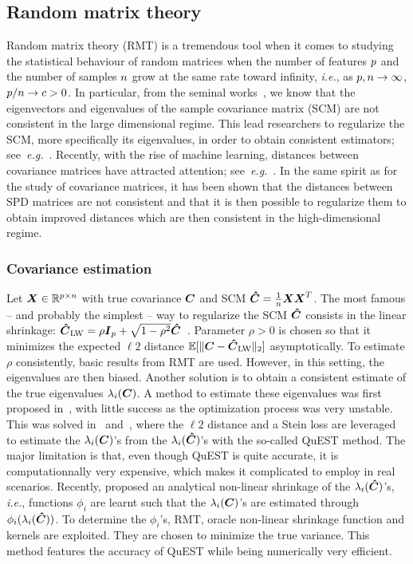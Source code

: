 \documentclass{article}
\theoremstyle{plain}
\theoremstyle{definition}
\theoremstyle{remark}
\begin{document}
\subsection{Random matrix theory}
Random matrix theory (RMT) is a tremendous tool when it comes to studying the statistical behaviour of random matrices when the number of features $p$ and the number of samples $n$ grow at the same rate toward infinity, \emph{i.e.}, as $p,n\to\infty$, $p/n\to c>0$.
In particular, from the seminal works~\cite{wishart1928generalised, marchenko1967distribution, silverstein1995empirical}, we know that the eigenvectors and eigenvalues of the sample covariance matrix (SCM) are not consistent in the large dimensional regime.
This lead researchers to regularize the SCM, more specifically its eigenvalues, in order to obtain consistent estimators; see~\emph{e.g.}~\cite{ledoit2015spectrum, ledoit2018optimal}.
Recently, with the rise of machine learning, distances between covariance matrices have attracted attention; see~\emph{e.g.}~\cite{couillet2019random, couillet2022random}. In the same spirit as for the study of covariance matrices, it has been shown that the distances between SPD matrices are not consistent and that it is then possible to regularize them to obtain improved distances which are then consistent in the high-dimensional regime.

\subsubsection{Covariance estimation}

Let $\boldsymbol{X}\in\mathbb{R}^{p\times n}$ with true covariance $\boldsymbol{C}$ and SCM $\boldsymbol{\hat{C}}=\frac1{n}\boldsymbol{X}\boldsymbol{X}^T$.
The most famous -- and probably the simplest -- way to regularize the SCM $\boldsymbol{\hat{C}}$ consists in the linear shrinkage: $\boldsymbol{\hat{C}}_{\textup{LW}} = \rho\boldsymbol{I}_{p} + \sqrt{1-\rho^2}\boldsymbol{\hat{C}}$~\cite{ledoit2004well}.
Parameter $\rho>0$ is chosen so that it minimizes the expected $\ell2$ distance $\mathbb{E}[\| \boldsymbol{C} - \boldsymbol{\hat{C}}_{\textup{LW}} \|_2]$ asymptotically.
To estimate $\rho$ consistently, basic results from RMT are used.
%
However, in this setting, the eigenvalues are then biased. Another solution is to obtain a consistent estimate of the true eigenvalues $\lambda_i(\boldsymbol{C})$.
A method to estimate these eigenvalues was first proposed in~\cite{KAR08}, with little success as the optimization process was very unstable.
This was solved in~\cite{ledoit2015spectrum} and~\cite{ledoit2018optimal}, where the $\ell2$ distance and a Stein loss are leveraged to estimate the $\lambda_i(\boldsymbol{C})$'s from the $\lambda_i(\boldsymbol{\hat{C}})$'s with the so-called QuEST method.
The major limitation is that, even though QuEST is quite accurate, it is computationnally very expensive, which makes it complicated to employ in real scenarios.
%
Recently, \cite{ledoit2020analytical} proposed an analytical non-linear shrinkage of the $\lambda_i(\boldsymbol{\hat{C}})$'s, \emph{i.e.}, functions $\phi_i$ are learnt such that the $\lambda_i(\boldsymbol{C})$'s are estimated through $\phi_i(\lambda_i(\boldsymbol{\hat{C}}))$.
To determine the $\phi_i$'s, RMT, oracle non-linear shrinkage function and kernels are exploited.
They are chosen to minimize the true variance.
This method features the accuracy of QuEST while being numerically very efficient.
\end{document}
